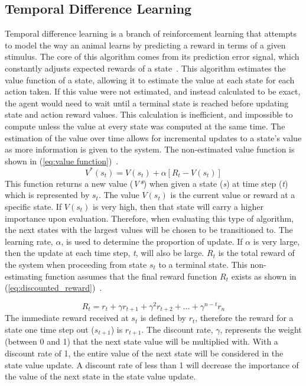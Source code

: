 \documentclass[12pt,american]{report}
\begin{document}
\subsection{Temporal Difference Learning}
Temporal difference learning is a branch of reinforcement learning that attempts to model the way an animal learns by predicting a reward in terms of a given stimulus. The core of this algorithm comes from its prediction error signal, which constantly adjusts expected rewards of a state~\cite{o2003temporal}. This algorithm estimates the value function of a state, allowing it to estimate the value at each state for each action taken.  If this value were not estimated, and instead calculated to be exact, the agent would need to wait until a terminal state is reached before updating state and action reward values. This calculation is inefficient, and impossible to compute unless the value at every state was computed at the same time. The estimation of the value over time allows for incremental updates to a state's value as more information is given to the system. The non-estimated value function is shown in (\ref{eq:value function})~\cite{Eden}.
        \begin{equation}
            \label{eq:value function}
            V^*(s_{t}) = V(s_{t}) + \alpha[R_{t}-V(s_{t})]
        \end{equation}
This function returns a new value (\textit{V*}) when given a state (\textit{s}) at time step (\textit{t}) which is represented by \textit{$s_t$}. The value \textit{$V(s_t)$} is the current value or reward at a specific state.  If \textit{$V(s_t)$} is very high, then that state will carry a higher importance upon evaluation. Therefore, when evaluating this type of algorithm, the next states with the largest values will be chosen to be transitioned to. The learning rate, \textit{$\alpha$}, is used to determine the proportion of update.  If \textit{$\alpha$} is very large, then the update at each time step, \textit{t}, will also be large.  \textit{$R_t$} is the total reward of the system when proceeding from state \textit{$s_t$} to a terminal state.  This non-estimating function assumes that the final reward function \textit{$R_{t}$} exists as shown in (\ref{eq:discounted_reward})~\cite{matiisen_2015}.

\begin{equation}
            \label{eq:discounted_reward}
            R_{t} = r_t + \gamma r_{t+1} + \gamma^2 r_{t+2} + ... + \gamma^{n-t}r_n 
        \end{equation}
The immediate reward received at \textit{$s_t$} is defined by \textit{$r_t$}, therefore the reward for a state one time step out (\textit{$s_{t+1}$}) is \textit{$r_{t+1}$}. The discount rate, \textit{$\gamma$}, represents the weight (between 0 and 1) that the next state value will be multiplied with.  With a discount rate of 1, the entire value of the next state will be considered in the state value update. A discount rate of less than 1 will decrease the importance of the value of the next state in the state value update.  
\end{document}
